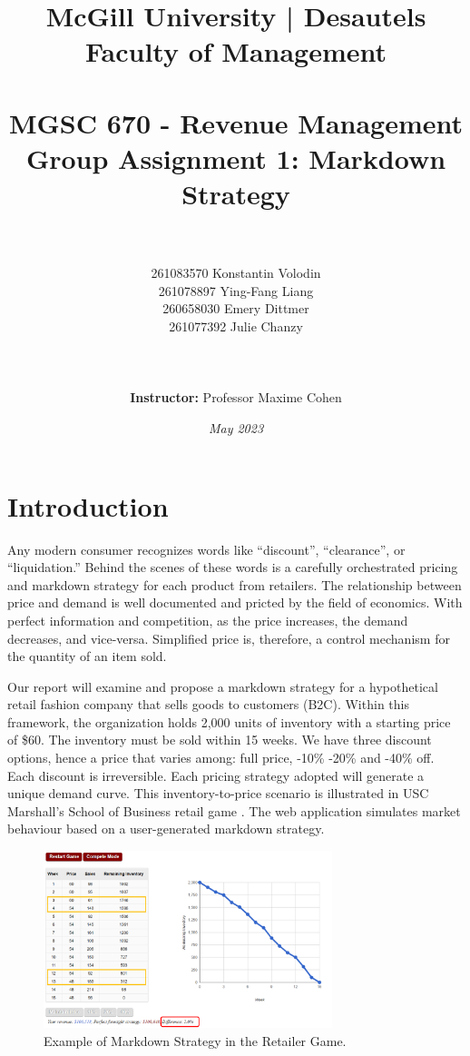 \documentclass[11pt,a4paper]{article}
\title{
\large{McGill University | Desautels Faculty of Management}\\
\hfill \break
\hfill \break
\hfill \break
\hfill \break
\\\Large MGSC 670 - Revenue Management\\
\textbf{Group Assignment 1: Markdown Strategy}\\
\hfill \break
\hfill \break
}
\author{\\\\
261083570 Konstantin Volodin\\
261078897 Ying-Fang Liang\\
260658030 Emery Dittmer\\
261077392 Julie Chanzy\\\\
\hfill \break
\\\\\textbf{Instructor:} Professor Maxime Cohen\\
\hfill \break
}
\date{\emph{May 2023}}
\begin{document}
\maketitle
\thispagestyle{empty}
\pagebreak

\tableofcontents
{}
\pagebreak

\setcounter{page}{1}
\section{Introduction}
Any modern consumer recognizes words like “discount”, “clearance”, or “liquidation.” 
Behind the scenes of these words is a carefully orchestrated pricing and markdown strategy for each product from retailers. 
The relationship between price and demand is well documented and pricted by the field of economics. 
With perfect information and competition, as the price increases, the demand decreases, and vice-versa. 
Simplified price is, therefore, a control mechanism for the quantity of an item sold. 

Our report will examine and propose a markdown strategy for a hypothetical retail fashion company that sells goods to customers (B2C). 
Within this framework, the organization holds 2,000 units of inventory with a starting price of \$60. 
The inventory must be sold within 15 weeks. We have three discount options, hence a price that varies among: full price, -10\% -20\% and -40\% off. 
Each discount is irreversible. Each pricing strategy adopted will generate a unique demand curve. 
This inventory-to-price scenario is illustrated in USC Marshall’s School of Business retail game \cite{RetailerGame}. 
The web application simulates market behaviour based on a user-generated markdown strategy.\\

\begin{figure}[h]
    \centering
    \includegraphics[width=0.75\textwidth]{pic/f1.png}
    \caption{Example of Markdown Strategy in the Retailer Game. \\\cite{RetailerGame}}
\end{figure}
\end{document}
